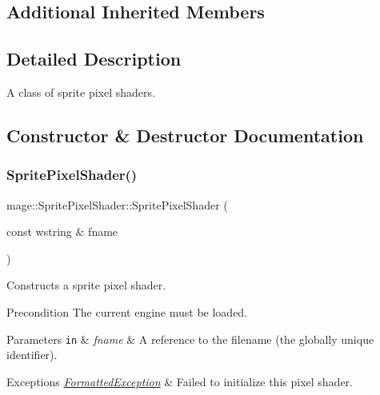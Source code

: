 \subsection*{Additional Inherited Members}


\subsection{Detailed Description}
A class of sprite pixel shaders. 

\subsection{Constructor \& Destructor Documentation}
\hypertarget{classmage_1_1_sprite_pixel_shader_a177d1f15a6230f079862967b9c3bdeaa}{}\label{classmage_1_1_sprite_pixel_shader_a177d1f15a6230f079862967b9c3bdeaa} 
\subsubsection{\texorpdfstring{Sprite\+Pixel\+Shader()}{SpritePixelShader()}\hspace{0.1cm}{\footnotesize\ttfamily [1/6]}}
{\footnotesize\ttfamily mage\+::\+Sprite\+Pixel\+Shader\+::\+Sprite\+Pixel\+Shader (\begin{DoxyParamCaption}\item[{const wstring \&}]{fname }\end{DoxyParamCaption})\hspace{0.3cm}{\ttfamily [explicit]}}

Constructs a sprite pixel shader.

\begin{DoxyPrecond}{Precondition}
The current engine must be loaded. 
\end{DoxyPrecond}

\begin{DoxyParams}[1]{Parameters}
\mbox{\tt in}  & {\em fname} & A reference to the filename (the globally unique identifier). \\
\hline
\end{DoxyParams}

\begin{DoxyExceptions}{Exceptions}
{\em \hyperlink{structmage_1_1_formatted_exception}{Formatted\+Exception}} & Failed to initialize this pixel shader. \\
\hline
\end{DoxyExceptions}
\hypertarget{classmage_1_1_sprite_pixel_shader_ad2d798e4235dd51e3536309709b003ff}{}\label{classmage_1_1_sprite_pixel_shader_ad2d798e4235dd51e3536309709b003ff} 

